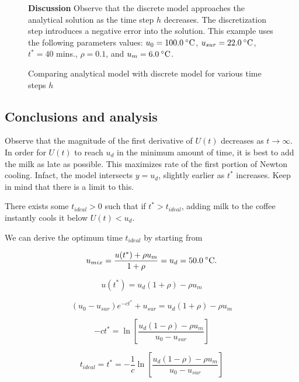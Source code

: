 \documentclass[11pt,oneside]{extarticle}
\newcommand{\Celsius}{\:\degree\mathrm{C}}
\numberwithin{equation}{section}
\numberwithin{figure}{section}
\begin{document}
\begin{figure}[H]
    \caption{Comparing analytical model with discrete model for various time steps $h$}
    \label{fig:analytic}
    \begin{center}
        {\graphicspath{{./figures/}}
        } 
        
        \scriptsize{ {\bf Discussion} Observe that the discrete model approaches
        the analytical solution as the time step $h$ decreases. The discretization
        step introduces a negative error into the solution. This example uses
        the following parameters values: $u_0 = 100.0\Celsius$, $u_{sur} = 22.0\Celsius$,
        $t^*=40$ mins., $\rho=0.1$, and $u_m=6.0\Celsius$.
    }
    \end{center}
\end{figure}

\subsection{Conclusions and analysis}

\par Observe that the magnitude of the first derivative of $U(t)$ decreases as 
$t\rightarrow\infty$. In order for $U(t)$ to reach $u_d$ in the minimum
amount of time, it is best to add the milk as late as possible. This maximizes
rate of the first portion of Newton cooling. Infact, the model intersects $y=u_d$,
slightly earlier as $t^*$ increases. Keep in mind that there is a limit to this.

There exists some $t_{ideal} > 0$ such that if $t^* > t_{ideal}$, adding milk to
the coffee instantly cools it below $U(t) < u_d$.

\par We can derive the optimum time $t_{ideal}$ by starting from

\begin{equation}
    u_{mix} = \frac{u(t^*) + \rho u_m }{1+\rho} = u_d = 50.0\Celsius.
\end{equation}

$$
u(t^*) = u_d(1+\rho) - \rho u_m
$$

$$
(u_0 - u_{sur})e^{-ct^*} + u_{sur} = u_d(1+\rho)-\rho u_m
$$

$$
-ct^* = \ln\left\lbrack \frac{u_d(1-\rho) - \rho u_m}{u_0 - u_{sur}}\right\rbrack
$$

\begin{equation}
    t_{ideal} = t^* = -\frac{1}{c}
    \ln\left\lbrack \frac{u_d(1-\rho) - \rho u_m}{u_0 - u_{sur}}\right\rbrack
\end{equation}
\end{document}
